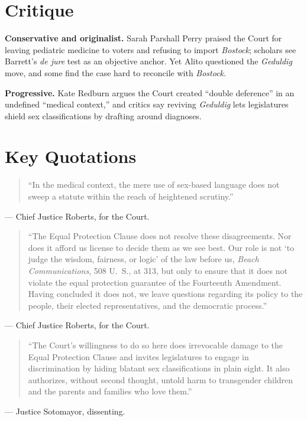 \documentclass[12pt]{article}
\begin{document}
\section{Critique}

\textbf{Conservative and originalist.} Sarah Parshall Perry praised the Court for leaving pediatric medicine to voters and refusing to import \textit{Bostock}; scholars see Barrett's \textit{de jure} test as an objective anchor. Yet Alito questioned the \textit{Geduldig} move, and some find the case hard to reconcile with \textit{Bostock}.

\textbf{Progressive.} Kate Redburn argues the Court created ``double deference'' in an undefined ``medical context,'' and critics say reviving \textit{Geduldig} lets legislatures shield sex classifications by drafting around diagnoses.

\section{Key Quotations}

\begin{quote}
``In the medical context, the mere use of sex-based language does not sweep a statute within the reach of heightened scrutiny.''
\end{quote}
\noindent --- Chief Justice Roberts, for the Court.

\begin{quote}
``The Equal Protection Clause does not resolve these disagreements. Nor does it afford us license to decide them as we see best. Our role is not `to judge the wisdom, fairness, or logic' of the law before us, \textit{Beach Communications}, 508 U.\ S., at 313, but only to ensure that it does not violate the equal protection guarantee of the Fourteenth Amendment. Having concluded it does not, we leave questions regarding its policy to the people, their elected representatives, and the democratic process.''
\end{quote}
\noindent --- Chief Justice Roberts, for the Court.

\begin{quote}
``The Court's willingness to do so here does irrevocable damage to the Equal Protection Clause and invites legislatures to engage in discrimination by hiding blatant sex classifications in plain sight. It also authorizes, without second thought, untold harm to transgender children and the parents and families who love them.''
\end{quote}
\noindent --- Justice Sotomayor, dissenting.
\end{document}
